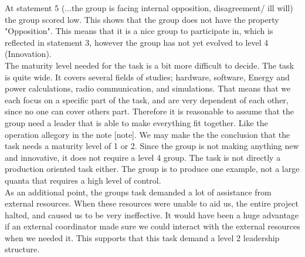 	At statement 5 (...the group is facing internal opposition, disagreement/ ill will) the group scored low. This shows that the group does not have the property "Opposition". This means that it is a nice group to participate in, which is reflected in statement 3, however the group has not yet evolved to level 4 (Innovation).
\\	
The maturity level needed for the task is a bit more difficult to decide. The task is quite wide. It covers several fields of studies; hardware, software, Energy and power calculations, radio communication, and simulations. That means that we each focus on a specific part of the task, and are very dependent of each other, since no one can cover others part. Therefore it is reasonable to assume that the group need a leader that is able to make everything fit together. Like the operation allegory in the note [note]. We may make the the conclusion that the task needs a maturity level of 1 or 2. Since the group is not making anything new and innovative, it does not require a level 4 group. The task is not directly a production oriented task either. The group is to produce one example, not a large quanta that requires a high level of control. 
\\
As an additional point, the groups task demanded a lot of assistance from external resources. When these resources were unable to aid us, the entire project halted, and caused us to be very ineffective. It would have been a huge advantage if an external coordinator made sure we could interact with the external resources when we needed it. This supports that this task demand a level 2 leadership structure.    
